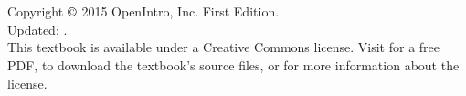 \chapter*{}
\vfill

\noindent Copyright $\copyright$ 2015 OpenIntro, Inc. First Edition. \\
Updated: \versiondate. \\

\noindent This textbook is available under a Creative Commons license. %
Visit  for a free PDF, to download the textbook's source files, or for more information about the license. \\


